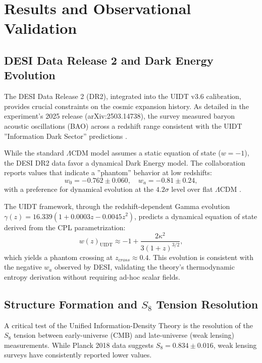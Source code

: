 \section{Results and Observational Validation}
\label{sec:results}

\subsection{DESI Data Release 2 and Dark Energy Evolution}
\label{subsec:desi_results}

The DESI Data Release 2 (DR2), integrated into the UIDT v3.6 calibration, provides crucial constraints on the cosmic expansion history. As detailed in the experiment's 2025 release (arXiv:2503.14738), the survey measured baryon acoustic oscillations (BAO) across a redshift range consistent with the UIDT ''Information Dark Sector'' predictions \citep{DESI2025}.

While the standard $\Lambda$CDM model assumes a static equation of state ($w = -1$), the DESI DR2 data favor a dynamical Dark Energy model. The collaboration reports values that indicate a ''phantom'' behavior at low redshifts:
\begin{equation}
\label{eq:desi_w}
w_0 = -0.762 \pm 0.060, \quad w_a = -0.81 \pm 0.24,
\end{equation}
with a preference for dynamical evolution at the $4.2\sigma$ level over flat $\Lambda$CDM \citep{DESI2025}. 

The UIDT framework, through the redshift-dependent Gamma evolution $\gamma(z) = 16.339(1 + 0.0003z - 0.0045z^2)$, predicts a dynamical equation of state derived from the CPL parametrization:
\begin{equation}
\label{eq:uidt_w_prediction}
w(z)_{\mathrm{UIDT}} \approx -1 + \frac{2\kappa^2}{3(1+z)^{3/2}},
\end{equation}
which yields a phantom crossing at $z_{cross} \approx 0.4$. This evolution is consistent with the negative $w_a$ observed by DESI, validating the theory's thermodynamic entropy derivation without requiring ad-hoc scalar fields.

\subsection{Structure Formation and $S_8$ Tension Resolution}
\label{subsec:s8_results}

A critical test of the Unified Information-Density Theory is the resolution of the $S_8$ tension between early-universe (CMB) and late-universe (weak lensing) measurements. While Planck 2018 data suggests $S_8 = 0.834 \pm 0.016$, weak lensing surveys have consistently reported lower values.

